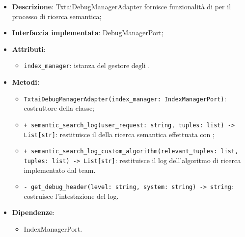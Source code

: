 \begin{itemize}
    \item \textbf{Descrizione}: TxtaiDebugManagerAdapter fornisce funzionalità di  per il processo di ricerca semantica;
    \item \textbf{Interfaccia implementata}: \hyperref[DebugManagerPort]{DebugManagerPort};
    \item \textbf{Attributi}:
    \begin{itemize}
        \item \texttt{index\_manager}: istanza del gestore degli .
    \end{itemize}
    \item \textbf{Metodi:}
    \begin{itemize}
        \item \texttt{TxtaiDebugManagerAdapter(index\_manager: IndexManagerPort)}: costruttore della classe;
        \item \texttt{+ semantic\_search\_log(user\_request: string, tuples: list) -> List[str]}: restituisce il  della ricerca semantica effettuata con ;
        \item \texttt{+ semantic\_search\_log\_custom\_algorithm(relevant\_tuples: list, tuples: list) -> List[str]}: restituisce il log dell'algoritmo di ricerca implementato dal team.
        \item \texttt{- get\_debug\_header(level: string, system: string) -> string}: costruisce l'intestazione del log.
    \end{itemize}
    \item \textbf{Dipendenze}:
    \begin{itemize}
        \item IndexManagerPort.
    \end{itemize}
\end{itemize} 

